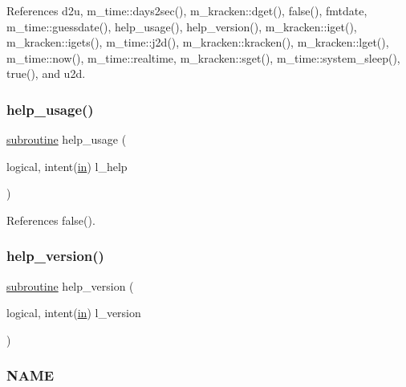 References d2u, m\+\_\+time\+::days2sec(), m\+\_\+kracken\+::dget(), false(), fmtdate, m\+\_\+time\+::guessdate(), help\+\_\+usage(), help\+\_\+version(), m\+\_\+kracken\+::iget(), m\+\_\+kracken\+::igets(), m\+\_\+time\+::j2d(), m\+\_\+kracken\+::kracken(), m\+\_\+kracken\+::lget(), m\+\_\+time\+::now(), m\+\_\+time\+::realtime, m\+\_\+kracken\+::sget(), m\+\_\+time\+::system\+\_\+sleep(), true(), and u2d.

\mbox{\label{paws_8f90_a3e09a3b52ee8fb04eeb93fe5761626a8}} 
\subsubsection{\texorpdfstring{help\+\_\+usage()}{help\_usage()}}
{\footnotesize\ttfamily \hyperlink{M__stopwatch_83_8txt_acfbcff50169d691ff02d4a123ed70482}{subroutine} help\+\_\+usage (\begin{DoxyParamCaption}\item[{logical, intent(\hyperlink{M__journal_83_8txt_afce72651d1eed785a2132bee863b2f38}{in})}]{l\+\_\+help }\end{DoxyParamCaption})}



References false().

\mbox{\label{paws_8f90_a39c21619b08a3c22f19e2306efd7f766}} 
\subsubsection{\texorpdfstring{help\+\_\+version()}{help\_version()}}
{\footnotesize\ttfamily \hyperlink{M__stopwatch_83_8txt_acfbcff50169d691ff02d4a123ed70482}{subroutine} help\+\_\+version (\begin{DoxyParamCaption}\item[{logical, intent(\hyperlink{M__journal_83_8txt_afce72651d1eed785a2132bee863b2f38}{in})}]{l\+\_\+version }\end{DoxyParamCaption})}



\subsubsection*{N\+A\+ME}


